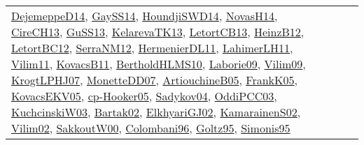 {\begin{longtable}{llp{6cm}p{6cm}p{6cm}}
\href{papers/DejemeppeD14.pdf}{DejemeppeD14}\cite{DejemeppeD14}, \href{papers/GaySS14.pdf}{GaySS14}\cite{GaySS14}, \href{papers/HoundjiSWD14.pdf}{HoundjiSWD14}\cite{HoundjiSWD14}, \href{articles/NovasH14.pdf}{NovasH14}\cite{NovasH14}, \href{papers/CireCH13.pdf}{CireCH13}\cite{CireCH13}, \href{papers/GuSS13.pdf}{GuSS13}\cite{GuSS13}, \href{papers/KelarevaTK13.pdf}{KelarevaTK13}\cite{KelarevaTK13}, \href{papers/LetortCB13.pdf}{LetortCB13}\cite{LetortCB13}, \href{papers/HeinzB12.pdf}{HeinzB12}\cite{HeinzB12}, \href{papers/LetortBC12.pdf}{LetortBC12}\cite{LetortBC12}, \href{papers/SerraNM12.pdf}{SerraNM12}\cite{SerraNM12}, \href{papers/HermenierDL11.pdf}{HermenierDL11}\cite{HermenierDL11}, \href{papers/LahimerLH11.pdf}{LahimerLH11}\cite{LahimerLH11}, \href{papers/Vilim11.pdf}{Vilim11}\cite{Vilim11}, \href{articles/KovacsB11.pdf}{KovacsB11}\cite{KovacsB11}, \href{papers/BertholdHLMS10.pdf}{BertholdHLMS10}\cite{BertholdHLMS10}, \href{papers/Laborie09.pdf}{Laborie09}\cite{Laborie09}, \href{papers/Vilim09.pdf}{Vilim09}\cite{Vilim09}, \href{papers/KrogtLPHJ07.pdf}{KrogtLPHJ07}\cite{KrogtLPHJ07}, \href{papers/MonetteDD07.pdf}{MonetteDD07}\cite{MonetteDD07}, \href{papers/ArtiouchineB05.pdf}{ArtiouchineB05}\cite{ArtiouchineB05}, \href{papers/FrankK05.pdf}{FrankK05}\cite{FrankK05}, \href{papers/KovacsEKV05.pdf}{KovacsEKV05}\cite{KovacsEKV05}, \href{papers/cp-Hooker05.pdf}{cp-Hooker05}\cite{cp-Hooker05}, \href{papers/Sadykov04.pdf}{Sadykov04}\cite{Sadykov04}, \href{papers/OddiPCC03.pdf}{OddiPCC03}\cite{OddiPCC03}, \href{articles/KuchcinskiW03.pdf}{KuchcinskiW03}\cite{KuchcinskiW03}, \href{papers/Bartak02.pdf}{Bartak02}\cite{Bartak02}, \href{papers/ElkhyariGJ02.pdf}{ElkhyariGJ02}\cite{ElkhyariGJ02}, \href{papers/KamarainenS02.pdf}{KamarainenS02}\cite{KamarainenS02}, \href{papers/Vilim02.pdf}{Vilim02}\cite{Vilim02}, \href{articles/SakkoutW00.pdf}{SakkoutW00}\cite{SakkoutW00}, \href{papers/Colombani96.pdf}{Colombani96}\cite{Colombani96}, \href{papers/Goltz95.pdf}{Goltz95}\cite{Goltz95}, \href{papers/Simonis95.pdf}{Simonis95}\cite{Simonis95}\\

\end{longtable}}
